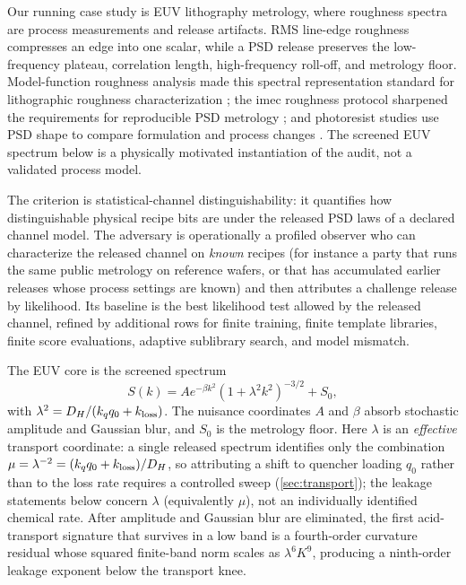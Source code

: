 \documentclass[11pt]{article}
\begin{document}
Our running case study is EUV lithography metrology, where roughness spectra are process measurements and release artifacts. RMS line-edge roughness compresses an edge into one scalar, while a PSD release preserves the low-frequency plateau, correlation length, high-frequency roll-off, and metrology floor. Model-function roughness analysis made this spectral representation standard for lithographic roughness characterization \cite{constantoudis2004}; the imec roughness protocol sharpened the requirements for reproducible PSD metrology \cite{lorusso2018}; and photoresist studies use PSD shape to compare formulation and process changes \cite{cutler2021}. The screened EUV spectrum below is a physically motivated instantiation of the audit, not a validated process model.

The criterion is statistical-channel distinguishability: it quantifies how distinguishable physical recipe bits are under the released PSD laws of a declared channel model. The adversary is operationally a profiled observer who can characterize the released channel on \emph{known} recipes (for instance a party that runs the same public metrology on reference wafers, or that has accumulated earlier releases whose process settings are known) and then attributes a challenge release by likelihood. Its baseline is the best likelihood test allowed by the released channel, refined by additional rows for finite training, finite template libraries, finite score evaluations, adaptive sublibrary search, and model mismatch.

The EUV core is the screened spectrum
\[
S(k)=A e^{-\beta k^2}(1+\lambda^2k^2)^{-3/2}+S_0,
\]
with \(\lambda^2=D_H/(k_qq_0+k_{\rm loss})\). The nuisance coordinates \(A\) and \(\beta\) absorb stochastic amplitude and Gaussian blur, and \(S_0\) is the metrology floor. Here \(\lambda\) is an \emph{effective} transport coordinate: a single released spectrum identifies only the combination \(\mu=\lambda^{-2}=(k_qq_0+k_{\rm loss})/D_H\), so attributing a shift to quencher loading \(q_0\) rather than to the loss rate requires a controlled sweep (\cref{sec:transport}); the leakage statements below concern \(\lambda\) (equivalently \(\mu\)), not an individually identified chemical rate. After amplitude and Gaussian blur are eliminated, the first acid-transport signature that survives in a low band is a fourth-order curvature residual whose squared finite-band norm scales as \(\lambda^6K^9\), producing a ninth-order leakage exponent below the transport knee.
\end{document}
